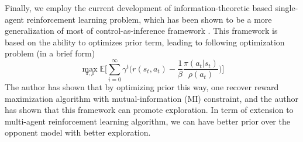 Finally, we employ the current development of information-theoretic based single-agent reinforcement learning problem, which has been shown to be a more generalization of most of control-as-inference framework \cite{grau2018soft, leibfried2019unified}. This framework is based on the ability to optimizes prior term, leading to following optimization problem (in a brief form)
\begin{equation*}
    \max_{\pi, \rho} \mathbb{E} \Bigg[ \sum^\infty_{i=0} \gamma^{t} \bigg( r(s_t, a_t) - \frac{1}{\beta}\frac{\pi(a_t|s_t)}{\rho(a_t)} \bigg) \Bigg]
\end{equation*}
The author has shown that by optimizing prior this way, one recover reward maximization algorithm with mutual-information (MI) constraint, and the author has shown that this framework can promote exploration. In term of extension to multi-agent reinforcement learning algorithm, we can have better prior over the opponent model with better exploration. 